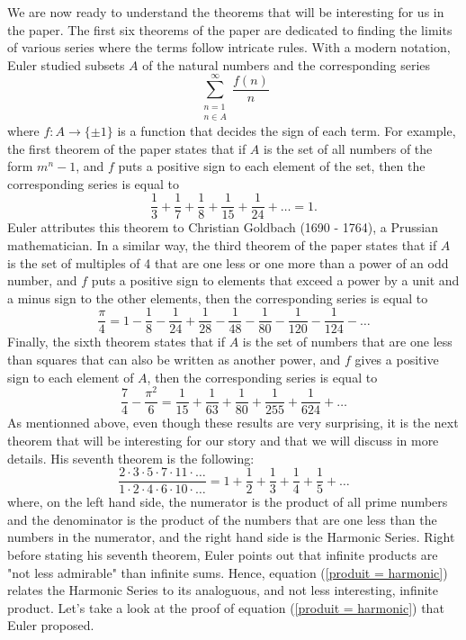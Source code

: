 We are now ready to understand the theorems that will be interesting for us in the paper. The first six theorems of the paper are dedicated to finding the limits of various series where the terms follow intricate rules. With a modern notation, Euler studied subsets $A$ of the natural numbers and the corresponding series
$$\sum_{\substack{n=1 \\ n \in A}}^{\infty}\frac{f(n)}{n}$$
where $f: A \to \{\pm 1\}$ is a function that decides the sign of each term. For example, the first theorem of the paper states that if $A$ is the set of all numbers of the form $m^n - 1$, and $f$ puts a positive sign to each element of the set, then the corresponding series is equal to
$$\frac{1}{3} + \frac{1}{7} + \frac{1}{8} + \frac{1}{15} + \frac{1}{24} + \dots = 1.$$
Euler attributes this theorem to Christian Goldbach (1690 - 1764), a Prussian mathematician. In a similar way, the third theorem of the paper states that if $A$ is the set of multiples of 4 that are one less or one more than a power of an odd number, and $f$ puts a positive sign to elements that exceed a power by a unit and a minus sign to the other elements, then the corresponding series is equal to
$$\frac{\pi}{4} = 1 - \frac{1}{8} - \frac{1}{24} + \frac{1}{28} - \frac{1}{48} - \frac{1}{80} - \frac{1}{120} - \frac{1}{124} - \dots$$
Finally, the sixth theorem states that if $A$ is the set of numbers that are one less than squares that can also be written as another power, and $f$ gives a positive sign to each element of $A$, then the corresponding series is equal to
$$\frac{7}{4} - \frac{\pi^2}{6} = \frac{1}{15} + \frac{1}{63} + \frac{1}{80} + \frac{1}{255} + \frac{1}{624} + \dots$$
As mentionned above, even though these results are very surprising, it is the next theorem that will be interesting for our story and that we will discuss in more details. His seventh theorem is the following:
\begin{equation} \label{produit = harmonic}
    \frac{2\cdot 3 \cdot 5 \cdot 7 \cdot 11 \cdot \dots}{1\cdot 2 \cdot 4 \cdot 6 \cdot 10 \cdot \dots} = 1 + \frac{1}{2} + \frac{1}{3} + \frac{1}{4} + \frac{1}{5} + \dots
\end{equation}
where, on the left hand side, the numerator is the product of all prime numbers and the denominator is the product of the numbers that are one less than the numbers in the numerator, and the right hand side is the Harmonic Series. Right before stating his seventh theorem, Euler points out that infinite products are "not less admirable" than infinite sums. Hence, equation (\ref{produit = harmonic}) relates the Harmonic Series to its analoguous, and not less interesting, infinite product. Let's take a look at the proof of equation (\ref{produit = harmonic}) that Euler proposed.


